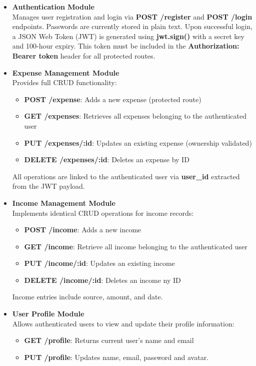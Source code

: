 \documentclass[12pt]{report}
\begin{document}
\begin{itemize}
    \item \textbf{Authentication Module} \\
    Manages user registration and login via \textbf{POST /register} and \textbf{POST /login} endpoints. Passwords are currently stored in plain text. Upon successful login, a JSON Web Token (JWT) is generated using \textbf{jwt.sign()} with a secret key and 100-hour expiry. This token must be included in the \textbf{Authorization: Bearer token} header for all protected routes.

    \item \textbf{Expense Management Module} \\
    Provides full CRUD functionality:
    \begin{itemize}
        \item \textbf{POST /expense}: Adds a new expense (protected route)
        \item \textbf{GET /expenses}: Retrieves all expenses belonging to the authenticated user
        \item \textbf{PUT /expenses/:id}: Updates an existing expense (ownership validated)
        \item \textbf{DELETE /expenses/:id}: Deletes an expense by ID
    \end{itemize}
    All operations are linked to the authenticated user via \textbf{user\_id} extracted from the JWT payload.

    \item \textbf{Income Management Module} \\
    Implements identical CRUD operations for income records:
    \begin{itemize}
        \item \textbf{POST /income}: Adds a new income
        \item \textbf{GET /income}: Retrieve all income belonging to the authenticated user
        \item \textbf{PUT /income/:id}: Updates an existing income
        \item \textbf{DELETE /income/:id}: Deletes an income ny ID
    \end{itemize}
    Income entries include source, amount, and date.

    \item \textbf{User Profile Module} \\
    Allows authenticated users to view and update their profile information:
    \begin{itemize}
        \item \textbf{GET /profile}: Returns current user's name and email
        \item \textbf{PUT /profile}: Updates name, email, password and avatar.
    \end{itemize}


\end{itemize}
\end{document}
